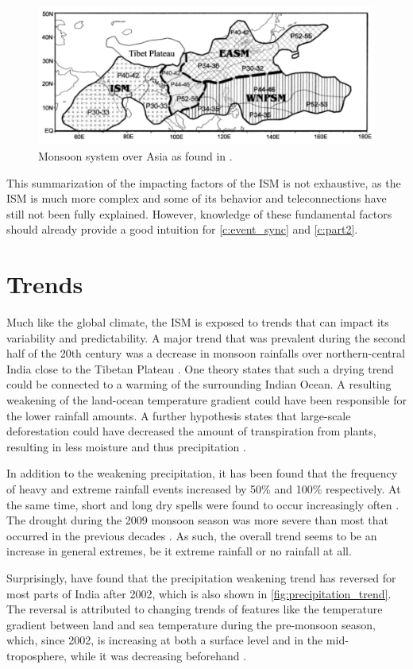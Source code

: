 \begin{figure}[h]
  \centering
  \includegraphics[width=0.55\linewidth]{./99_appendix/img/monsoon_system}
  \caption{Monsoon system over Asia as found in \citet{Yihui.2005}.}
  \label{fig:monsoon_system}
\end{figure}

This summarization of the impacting factors of the ISM is not exhaustive, as the ISM is much more complex and some of its behavior and teleconnections have still not been fully explained. However, knowledge of these fundamental factors should already provide a good intuition for \cref{c:event_sync} and \cref{c:part2}.


\section{Trends}
\label{st:ism_trends}
Much like the global climate, the ISM is exposed to trends that can impact its variability and predictability. A major trend that was prevalent during the second half of the 20th century was a decrease in monsoon rainfalls over northern-central India close to the Tibetan Plateau \citep{Jin.2017}. One theory states that such a drying trend could be connected to a warming of the surrounding Indian Ocean. A resulting weakening of the land-ocean temperature gradient could have been responsible for the lower rainfall amounts. A further hypothesis states that large-scale deforestation could have decreased the amount of transpiration from plants, resulting in less moisture and thus precipitation \citep{Jin.2017}.

In addition to the weakening precipitation, it has been found that the frequency of heavy and extreme rainfall events increased by 50\% and 100\% respectively. At the same time, short and long dry spells were found to occur increasingly often \citep{Auffhammer.2012}. The drought during the 2009 monsoon season was more severe than most that occurred in the previous decades \citep{Auffhammer.2012}. As such, the overall trend seems to be an increase in general extremes, be it extreme rainfall or no rainfall at all.

Surprisingly, \citet{Jin.2017} have found that the precipitation weakening trend has reversed for most parts of India after 2002, which is also shown in \cref{fig:precipitation_trend}. The reversal is attributed to changing trends of features like the temperature gradient between land and sea temperature during the pre-monsoon season, which, since 2002, is increasing at both a surface level and in the mid-troposphere, while it was decreasing beforehand \citep{Jin.2017}.

